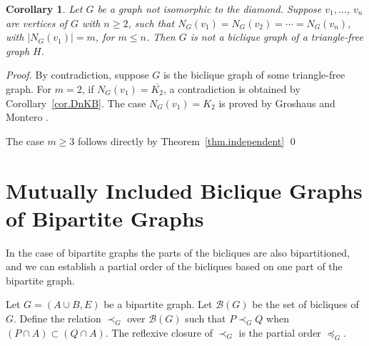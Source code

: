 \documentclass{article}
\newcommand{\mB}{\ensuremath{\mathcal{B}}}
\newtheorem{corollary}{Corollary}
\begin{document}
\begin{corollary}\label{cor.conjectureGM}
  Let $G$ be a graph not isomorphic to   the    diamond. 
  Suppose $v_1,     \ldots$,     $v_n$   
  are vertices of $G$ with $n \geq 2$,  such    that
  $N_G(v_1) = N_G(v_2) = \cdots =  N_G(v_n)$, with $|N_G(v_1)|=m$, for $m \leq n$. Then $G$ is not a biclique graph of a
  triangle-free graph $H$.
\end{corollary}
\begin{proof} 
  By contradiction, suppose  $G$ is the biclique graph  of some triangle-free graph.
%
  For  $m  =  2$,  if $N_G(v_1)=  \overline{K_2}$,  a  contradiction  is
  obtained  by  Corollary~\ref{cor.DnKB}.  The  case  $N_G(v_1)=K_2$  is
  proved     by      Groshaus     and      Montero     \cite[Proposition
  4.6]{GroshausMontero2019}.
  
  The case $m \geq 3$ follows directly by Theorem~\ref{thm.independent}
%  
  \qed
\end{proof}

\section{Mutually Included Biclique Graphs of Bipartite Graphs}

In the  case of  bipartite graphs  the parts of  the bicliques  are also
bipartitioned, and we can establish a partial order of the bicliques based
on one part of the bipartite graph.

Let $G = (A  \cup B, E)$ be a bipartite graph.  Let  $\mB(G)$ be the set
of bicliques of  $G$.  Define the relation $\prec_G$  over $\mB(G)$ such
that $P \prec_G Q$ when $(P \cap  A) \subset (Q \cap A)$.  The reflexive
closure of $\prec_G$ is the partial order $\preceq_G$.
\end{document}
